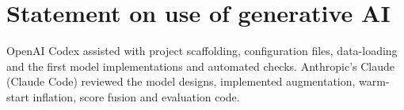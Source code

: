 \section*{Statement on use of generative AI}

OpenAI Codex assisted with project scaffolding, configuration files,
data-loading and the first model implementations and automated checks. 
Anthropic's Claude (Claude Code) reviewed the model
designs, implemented augmentation, warm-start inflation, score fusion and evaluation code.